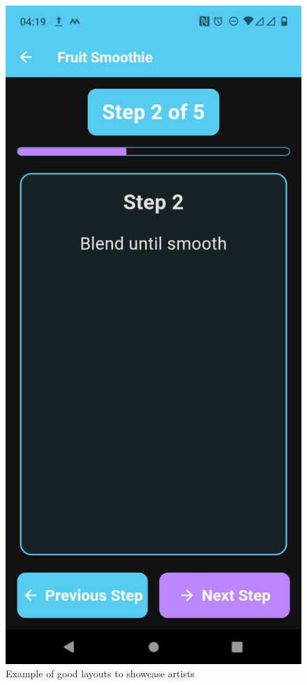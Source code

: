 \documentclass[]{project_final}
\begin{document}
\begin{figure}[ht!]
\begin{minipage}[t]{0.4\textwidth}
    \end{minipage}
    \hfill
    \begin{minipage}[t]{0.4\textwidth}
        \includegraphics[height=0.5\textheight]{STEP2.png}
    \end{minipage}
    \caption{Example of good layouts to showcase artists}
    \label{fig:1}
\end{figure}
\end{document}
